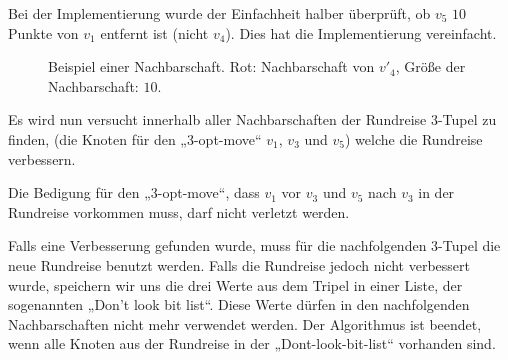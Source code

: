 \begin{bem}
  Bei der Implementierung wurde der Einfachheit halber  überprüft, 
  ob $v_5$ $10$ Punkte von $v_1$ entfernt ist (nicht $v_4$). Dies hat
  die Implementierung vereinfacht. 
\end{bem}
\begin{figure}[bh]
  \centering
  \caption[Beispiel einer Nachbarschaft $\mathcal{N}(v)$]{Beispiel
  einer Nachbarschaft. Rot: Nachbarschaft von $v'_4$, Größe der
  Nachbarschaft: $10$.}
\end{figure}
Es wird nun versucht innerhalb aller Nachbarschaften der Rundreise 3-Tupel zu finden, (die
Knoten für den „3-opt-move“ $v_1$, $v_3$ und $v_5$) welche die Rundreise
verbessern.
\begin{bem}
Die Bedigung für den „3-opt-move“, dass $v_1$ vor $v_3$ und $v_5$ nach
  $v_3$ in der Rundreise vorkommen muss, darf nicht verletzt werden.
\end{bem}
Falls eine Verbesserung gefunden wurde, muss für die nachfolgenden
3-Tupel die neue Rundreise benutzt werden. Falls die Rundreise jedoch
nicht verbessert wurde, speichern wir uns die drei Werte aus dem Tripel
in einer Liste, der sogenannten „Don't look bit list“. Diese Werte dürfen in den
nachfolgenden Nachbarschaften nicht mehr verwendet werden. Der
Algorithmus ist beendet, wenn alle Knoten aus der Rundreise in der
„Dont-look-bit-list“ vorhanden sind.
\newpage

